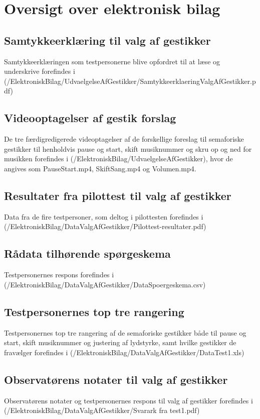 \chapter{Oversigt over elektronisk bilag}
\label{app:OversigtOverElektroniskBilag}
%
%
\section{Samtykkeerklæring til valg af gestikker}
\label{app:SamtykkeerklaeringValgAfGestikker}
%
Samtykkeerklæringen som testpersonerne blive opfordret til at læse og underskrive forefindes i (/ElektroniskBilag/UdvaelgelseAfGestikker/SamtykkeerklaeringValgAfGestikker.pdf)
%
\section{Videooptagelser af gestik forslag}
\label{app:VideooptagelseGestikForslag}
%
De tre færdigredigerede videoptagelser af de forskellige foreslag til semaforiske gestikker til henholdvis pause og start, skift musiknummer og skru op og ned for musikken forefindes i (/ElektroniskBilag/UdvaelgelseAfGestikker), hvor de angives som PauseStart.mp4, SkiftSang.mp4 og Volumen.mp4.
%
\section{Resultater fra pilottest til valg af gestikker}
\label{app:ResultaterPilottestValgAfGestikker}
%
Data fra de fire testpersoner, som deltog i pilottesten forefindes i \\
(/ElektroniskBilag/DataValgAfGestikker/Pilottest-resultater.pdf)
%
\section{Rådata tilhørende spørgeskema}
\label{app:RaaDataSpoergeskema}
%
Testpersonernes respons forefindes i (/ElektroniskBilag/DataValgAfGestikker/DataSpoergeskema.csv)
%
\section{Testpersonernes top tre rangering}
\label{app:TestpersonernesTopTre}
%
Testpersonernes top tre rangering af de semaforiske gestikker både til pause og start, skift musiknummer og justering af lydstyrke, samt hvilke gestikker de fravælger forefindes i (/ElektroniskBilag/DataValgAfGestikker/DataTest1.xls)
%
\section{Observatørens notater til valg af gestikker}
\label{app:NoterValgAfGestikker}
%
Observatørens notater og testpersonernes respons til valg af gestikker forefindes i (/ElektroniskBilag/DataValgAfGestikker/Svarark fra test1.pdf)
%
